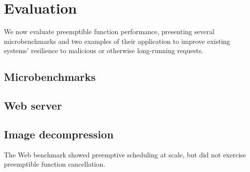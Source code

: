 \section{Evaluation}
\label{sec:eval}

We now evaluate preemptible function performance, presenting several
microbenchmarks and two examples of their application to improve
existing systems' resilience to malicious or otherwise long-running
requests.




\subsection{Microbenchmarks}





\subsection{Web server}




\subsection{Image decompression}

The Web benchmark showed preemptive scheduling at scale, but did not exercise
preemptible function cancellation.

